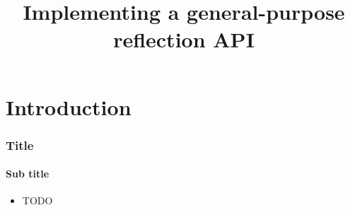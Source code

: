 \documentclass[compress,table,xcolor=table]{beamer}
\begin{document}
\title{Implementing a general-purpose reflection API}
\section{Introduction}
\frame{\titlepage}
\begin{frame}
  \frametitle{Title}
  \framesubtitle{Sub title}
  \begin{itemize}
	\item{TODO}
  \end{itemize}
\end{frame}
\end{document}

